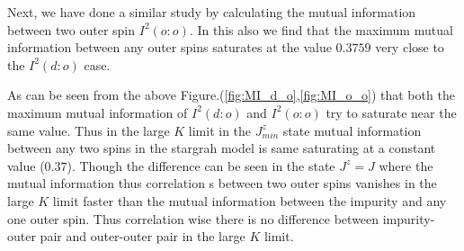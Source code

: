 \documentclass[reprint,prb,superscriptaddress]{revtex4-2}
\begin{document}
Next, we have done a similar study by calculating the mutual information between two outer spin $I^2(o:o)$. In this also we find that the maximum mutual information between any outer spins saturates at the value $0.3759$ very close to the $I^2(d:o)$ case.

\par As can be seen from the above Figure.(\ref{fig:MI_d_o},\ref{fig:MI_o_o}) that  both the maximum mutual information of $I^2(d:o)$ and $I^2(o:o)$ try to saturate near the same value. Thus in the large $K$ limit in the $J^z_{min}$ state mutual information between any two spins in the stargrah model is same saturating at a constant value ($0.37$). Though the difference can be seen in the state $J^z=J$ where the mutual information thus correlation s between two outer spins vanishes in the large $K$ limit faster than the mutual information between the impurity and any one outer spin. Thus correlation wise there is no difference between impurity-outer pair and outer-outer pair in the large $K$ limit.
\end{document}
